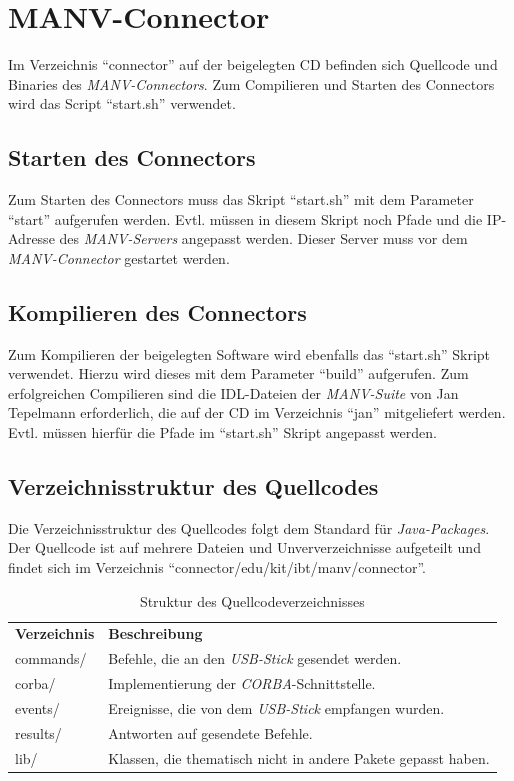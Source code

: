    \section{MANV-Connector}

    Im Verzeichnis "`connector"' auf der beigelegten CD befinden sich
    Quellcode und Binaries des \emph{MANV-Connectors}. Zum Compilieren
    und Starten des Connectors wird das Script "`start.sh"' verwendet.

    \subsection{Starten des Connectors}

    Zum Starten des Connectors muss das Skript "`start.sh"' mit dem Parameter
    "`start"' aufgerufen werden. Evtl. müssen in diesem Skript noch Pfade
    und die IP-Adresse des \emph{MANV-Servers} angepasst werden. 
    Dieser Server muss vor dem \emph{MANV-Connector} gestartet werden.

    \subsection{Kompilieren des Connectors}

    Zum Kompilieren der beigelegten Software wird ebenfalls das "`start.sh"'
    Skript verwendet. Hierzu wird dieses mit dem Parameter "`build"' aufgerufen.
    Zum erfolgreichen Compilieren sind die IDL-Dateien der \emph{MANV-Suite}
    von Jan Tepelmann erforderlich, die auf der CD im Verzeichnis "`jan"'
    mitgeliefert werden. Evtl. müssen hierfür die Pfade im "`start.sh"'
    Skript angepasst werden.

    \subsection{Verzeichnisstruktur des Quellcodes}

    Die Verzeichnisstruktur des Quellcodes folgt dem Standard für \emph{Java-Packages}.
    Der Quellcode ist auf mehrere Dateien und Unververzeichnisse aufgeteilt
    und findet sich im Verzeichnis "`connector/edu/kit/ibt/manv/connector"'.
    
    \begin{table}
        \begin{tabular}{ll}
            \textbf{Verzeichnis} & \textbf{Beschreibung}\\

           commands/ & Befehle, die an den \emph{USB-Stick} gesendet werden.\\
           corba/    & Implementierung der \emph{CORBA}-Schnittstelle.\\
           events/   & Ereignisse, die von dem \emph{USB-Stick} empfangen wurden.\\
           results/  & Antworten auf gesendete Befehle.\\
           lib/      & Klassen, die thematisch nicht in andere Pakete gepasst haben.\\
        \end{tabular}
        \caption{Struktur des Quellcodeverzeichnisses}
    \end{table}

